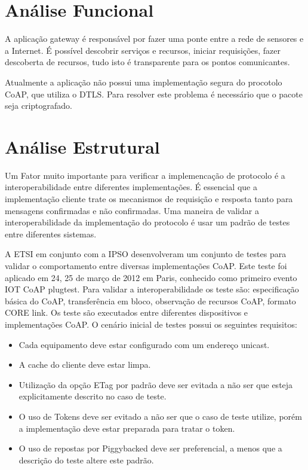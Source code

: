 \section{An\'alise Funcional}

A aplica\c{c}\~ao gateway \'e respons\'avel por fazer uma ponte entre a rede de sensores e a Internet. \'E poss\'ivel descobrir servi\c{c}os e recursos, iniciar requisi\c{c}\~oes, fazer descoberta de recursos, tudo  isto \'e transparente para os pontos comunicantes. 

Atualmente a aplica\c{c}\~ao n\~ao possui uma implementa\c{c}\~ao segura do procotolo CoAP, que utiliza o DTLS. Para resolver este problema \'e necess\'ario que o pacote seja criptografado.

\section{An\'alise Estrutural}

Um Fator muito importante para verificar a implemenca\c{c}\~ao de protocolo \'e a interoperabilidade entre diferentes implementa\c{c}\~oes. \'E essencial que a implementa\c{c}\~ao cliente trate os mecanismos de requisi\c{c}\~ao e resposta tanto para mensagens confirmadas e n\~ao confirmadas. Uma maneira de validar a interoperabilidade da implementa\c{c}\~ao do protocolo \'e usar um padr\~ao de testes entre diferentes sistemas.

A ETSI em conjunto com a IPSO desenvolveram um conjunto de testes para validar o comportamento entre diversas implementa\c{c}\~oes CoAP. Este teste foi aplicado em 24, 25 de mar\c{c}o de 2012 em Paris, conhecido como primeiro evento IOT CoAP plugtest. Para validar a interoperabilidade os teste s\~ao: especifica\c{c}\~ao b\'asica do CoAP, transfer\^encia em bloco, observa\c{c}\~ao de recursos CoAP, formato CORE link. Os teste s\~ao executados entre diferentes dispositivos e implementa\c{c}\~oes CoAP. O cen\'ario inicial de testes possui os seguintes requisitos:
\begin{itemize}
    \item Cada equipamento deve estar configurado com um endere\c{c}o unicast.
    \item A cache do cliente deve estar limpa.
    \item Utiliza\c{c}\~ao da op\c{c}\~ao ETag por padr\~ao deve ser evitada a n\~ao ser que esteja explicitamente descrito no caso de teste. 
    \item O uso de Tokens deve ser evitado a n\~ao ser que o caso de teste utilize, por\'em a implementa\c{c}\~ao deve estar preparada para tratar o token.
    \item O uso de repostas por Piggybacked deve ser preferencial, a menos que a descri\c{c}\~ao do teste altere este padr\~ao.
\end{itemize}

